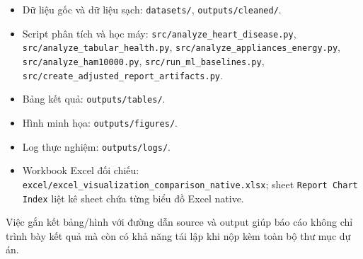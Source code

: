 \begin{itemize}
    \item Dữ liệu gốc và dữ liệu sạch: \texttt{datasets/}, \texttt{outputs/cleaned/}.
    \item Script phân tích và học máy: \texttt{src/analyze\_heart\_disease.py}, \texttt{src/analyze\_tabular\_health.py}, \texttt{src/analyze\_appliances\_energy.py}, \texttt{src/analyze\_ham10000.py}, \texttt{src/run\_ml\_baselines.py}, \texttt{src/create\_adjusted\_report\_artifacts.py}.
    \item Bảng kết quả: \texttt{outputs/tables/}.
    \item Hình minh họa: \texttt{outputs/figures/}.
    \item Log thực nghiệm: \texttt{outputs/logs/}.
    \item Workbook Excel đối chiếu: \texttt{excel/excel\_visualization\_comparison\_native.xlsx}; sheet \texttt{Report Chart Index} liệt kê sheet chứa từng biểu đồ Excel native.
\end{itemize}

Việc gắn kết bảng/hình với đường dẫn source và output giúp báo cáo không chỉ trình bày kết quả mà còn có khả năng tái lập khi nộp kèm toàn bộ thư mục dự án.

